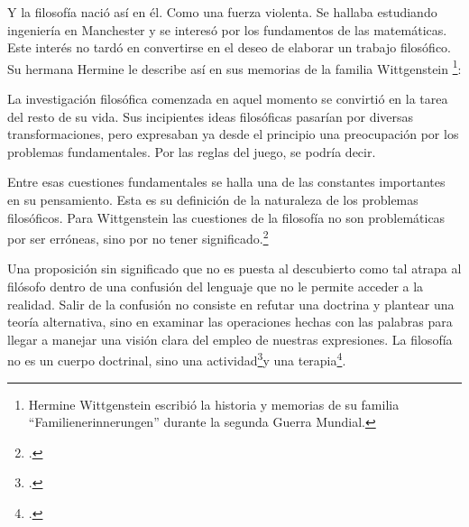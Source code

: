   Y la filosofía nació así en él. Como una fuerza violenta. Se hallaba estudiando
  ingeniería en Manchester y se interesó por los fundamentos de las matemáticas.
  Este interés no tardó en convertirse en el deseo de elaborar un trabajo
  filosófico. Su hermana Hermine le describe así en sus memorias de la familia
  Wittgenstein
  \footnote{Hermine Wittgenstein escribió la historia y memorias de su familia
    ``Familienerinnerungen'' durante la segunda Guerra Mundial.}:

  La investigación filosófica comenzada en aquel momento se convirtió en la
  tarea del resto de su vida. Sus incipientes ideas filosóficas pasarían por
  diversas transformaciones, pero expresaban ya desde el principio una
  preocupación por los problemas fundamentales. Por las reglas del juego, se
  podría decir.


  Entre esas cuestiones fundamentales se halla una de las constantes importantes
  en su pensamiento. Esta es su definición de la naturaleza de los problemas
  filosóficos. Para Wittgenstein las cuestiones de la filosofía no son
  problemáticas por ser erróneas, sino por no tener
  significado.\footcite[cf.~][4.003]{tractatus} 

  Una proposición sin significado que no es puesta al descubierto como tal
  atrapa al filósofo dentro de una confusión del lenguaje que no le permite
  acceder a la realidad. Salir de la confusión no consiste en refutar una
  doctrina y plantear una teoría alternativa, sino en examinar las operaciones
  hechas con las palabras para llegar a manejar una visión clara del empleo de
  nuestras expresiones. La filosofía no es un cuerpo doctrinal, sino una
  actividad\footcite[cf.~][4.112]{tractatus}y una
  terapia\footcite[cf.~][\S133]{PI}.

